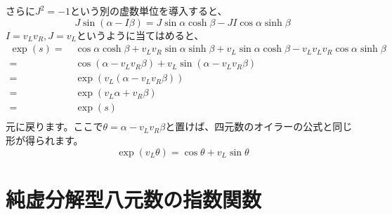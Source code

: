 \documentclass[a4paper,12pt,notitlepage]{jsreport}
\begin{document}
さらに$J^2=-1$という別の虚数単位を導入すると、
\begin{equation}
J\sin(\alpha-I\beta)=J\sin\alpha\cosh\beta-JI\cos\alpha\sinh\beta
\end{equation}
$I=v_Lv_R,J=v_L$というように当てはめると、
\begin{equation}
\begin{split}
\exp(s)=~&\cos\alpha\cosh\beta+v_Lv_R\sin\alpha\sinh\beta+v_L\sin\alpha\cosh\beta-v_Lv_Lv_R\cos\alpha\sinh\beta\\
=~&\cos(\alpha-v_Lv_R\beta)+v_L\sin(\alpha-v_Lv_R\beta)\\
=~&\exp(v_L(\alpha-v_Lv_R\beta))\\
=~&\exp(v_L\alpha+v_R\beta)\\
=~&\exp(s)\\
\end{split}
\end{equation}
元に戻ります。ここで$\theta=\alpha-v_Lv_R\beta$と置けば、四元数のオイラーの公式と同じ形が得られます。
\begin{equation}
\exp(v_L\theta)=\cos\theta+v_L\sin\theta
\end{equation}

\section{純虚分解型八元数の指数関数}
\end{document}
